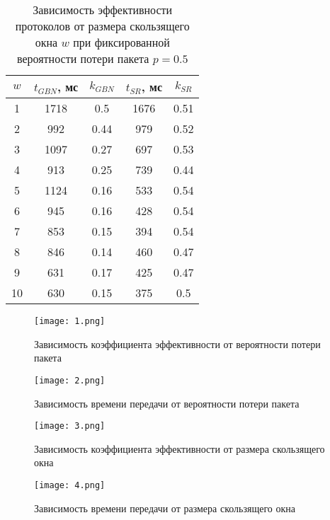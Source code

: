 \documentclass{report}
\begin{document}
\begin{table}[h]
\centering
\begin{tabular}{ |c|c|c|c|c| }
 \hline
 $w$ & $t_{GBN}$, мс & $k_{GBN}$ & $t_{SR}$, мс & $k_{SR}$ \\ [0.5ex] 
 \hline
 1 & 1718 & 0.5 & 1676 & 0.51 \\ 
 2 & 992 & 0.44 & 979 & 0.52 \\ 
 3 & 1097 & 0.27 & 697 & 0.53 \\ 
 4 & 913 & 0.25 & 739 & 0.44 \\ 
 5 & 1124 & 0.16 & 533 & 0.54 \\ 
 6 & 945 & 0.16 & 428 & 0.54 \\ 
 7 & 853 & 0.15 & 394 & 0.54 \\ 
 8 & 846 & 0.14 & 460 & 0.47 \\ 
 9 & 631 & 0.17 & 425 & 0.47 \\ 
 10 & 630 & 0.15 & 375 & 0.5 \\ 
 \hline
\end{tabular}
\captionsetup{justification=centering}
\caption{Зависимость эффективности протоколов от размера скользящего окна $w$ при фиксированной вероятности потери пакета $p=0.5$}
\end{table}

\begin{figure}[bp!]
    \centering
    \texttt{[image: 1.png]}
    \caption{Зависимость коэффициента эффективности от вероятности потери пакета}
    \label{fig:1.png}
\end{figure}

\begin{figure}[bp!]
    \centering
    \texttt{[image: 2.png]}
    \caption{Зависимость времени передачи от вероятности потери пакета}
    \label{fig:2.png}
\end{figure}

\begin{figure}[bp!]
    \centering
    \texttt{[image: 3.png]}
    \caption{Зависимость коэффициента эффективности от размера скользящего окна}
    \label{fig:1.png}
\end{figure}

\begin{figure}[bp!]
    \centering
    \texttt{[image: 4.png]}
    \caption{Зависимость времени передачи от размера скользящего окна}
    \label{fig:2.png}
\end{figure}
\end{document}
